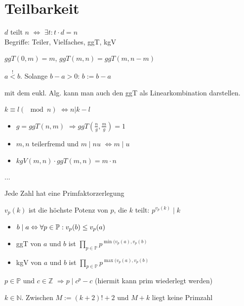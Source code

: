 \section{Teilbarkeit}

 $d$ teilt $n$ $\Leftrightarrow$ $\exists t: t \cdot d = n$ \\
Begriffe: Teiler, Vielfaches, ggT, kgV

 $ggT(0,m)=m$, $ggT(m,n) = ggT(m,n-m)$

 $a\stackrel{!}{<}b$. Solange $b-a>0$: $b:= b-a$

\bem{} mit dem eukl. Alg. kann man auch den ggT als Linearkombination darstellen.

 $k\equiv l (\mod n)$ $\Leftrightarrow n | k-l$

\bem{}
\begin{itemize}
    \item $g=ggT(n,m)$ $ \Rightarrow ggT(\frac{n}{g},\frac{m}{g}) = 1$
    \item $m,n$ teilerfremd und $m \mid nu$ $\Leftrightarrow m\mid u$
    \item $kgV(m,n) \cdot ggT(m,n) = m \cdot n$
\end{itemize}

 ...

 Jede Zahl hat eine Primfaktorzerlegung

 $v_p(k)$ ist die höchste Potenz von $p$, die $k$ teilt: $p^{v_p(k)} \mid k$

\bem{}
\begin{itemize}
    \item $b \mid a \Leftrightarrow \forall p \in \mathbb{P}: v_p(b)\leq v_p(a)$
    \item ggT von $a$ und $b$ ist $\prod_{p\in\mathbb{P}}p^{\min(v_p(a),v_p(b)}$
    \item kgV von $a$ und $b$ ist $\prod_{p\in\mathbb{P}}p^{\max(v_p(a),v_p(b)}$
\end{itemize}

 $p\in\mathbb{P}$ und $c\in\mathbb{Z}$ $\Rightarrow p \mid c^p-c$ { \footnotesize (hiermit kann prim wiederlegt werden)}

 $k\in\mathbb{N}$. Zwischen $M:=(k+2)!+2$ und $M+k$ liegt keine Primzahl

